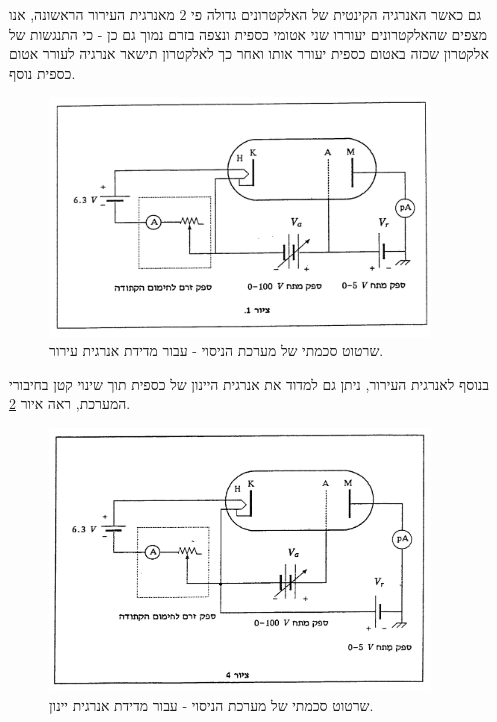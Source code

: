 \documentclass{article}
\begin{document}
גם כאשר האנרגיה הקינטית של האלקטרונים גדולה פי
$2$
מאנרגית העירור הראשונה, אנו מצפים שהאלקטרונים יעוררו שני אטומי כספית ונצפה בזרם נמוך גם כן - כי התנגשות של אלקטרון שכזה באטום כספית יעורר אותו ואחר כך לאלקטרון תישאר אנרגיה לעורר אטום כספית נוסף. 

\begin{figure}
	\centering
	\includegraphics[width=0.9\textwidth]{./system-scheme-excitations.png}
	\caption{
	שרטוט סכמתי של מערכת הניסוי - עבור מדידת אנרגית עירור.
	}
	\label{fig:system-scheme-excitations}
\end{figure}

בנוסף לאנרגית העירור, ניתן גם למדוד את אנרגית היינון של כספית תוך שינוי קטן בחיבורי המערכת, ראה איור
\ref{fig:system-scheme-ionization}.

\begin{figure}
    \centering
    \includegraphics[width=0.9\textwidth]{./system-scheme-ionization.png}
    \caption{
    שרטוט סכמתי של מערכת הניסוי - עבור מדידת אנרגית יינון.
    }
    \label{fig:system-scheme-ionization}
\end{figure}
\end{document}
